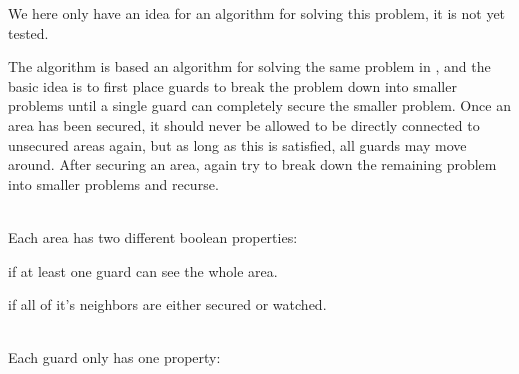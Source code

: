 We here only have an idea for an algorithm for solving this problem, it is not yet tested.

The algorithm is based an algorithm for solving the same problem in \cite{multiSearchSecure}, and the basic idea is to first place guards to break the problem down into smaller problems until a single guard can completely secure the smaller problem.
Once an area has been secured, it should never be allowed to be directly connected to unsecured areas again, but as long as this is satisfied, all guards may move around.
After securing an area, again try to break down the remaining problem into smaller problems and recurse.

\ \\
Each area has two different boolean properties:
\begin{definition}[Watched]
if at least one guard can see the whole area.
\end{definition}
\begin{definition}[Secured]
if all of it's neighbors are either secured or watched.
\end{definition}
\\
Each guard only has one property:
